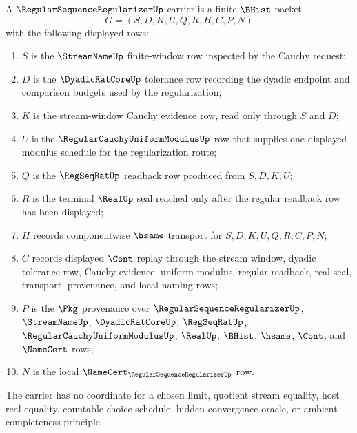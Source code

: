\begin{definition}
\label{def:regular-sequence-regularizer-carrier}
A $\RegularSequenceRegularizerUp$ carrier is a finite $\BHist$ packet
$$
G=(S,D,K,U,Q,R,H,C,P,N)
$$
with the following displayed rows:
\begin{enumerate}
\item $S$ is the $\StreamNameUp$ finite-window row inspected by the Cauchy request;
\item $D$ is the $\DyadicRatCoreUp$ tolerance row recording the dyadic endpoint and comparison budgets used by the regularization;
\item $K$ is the stream-window Cauchy evidence row, read only through $S$ and $D$;
\item $U$ is the $\RegularCauchyUniformModulusUp$ row that supplies one displayed modulus schedule for the regularization route;
\item $Q$ is the $\RegSeqRatUp$ readback row produced from $S,D,K,U$;
\item $R$ is the terminal $\RealUp$ seal reached only after the regular readback row has been displayed;
\item $H$ records componentwise $\hsame$ transport for $S,D,K,U,Q,R,C,P,N$;
\item $C$ records displayed $\Cont$ replay through the stream window, dyadic tolerance row, Cauchy evidence, uniform modulus, regular readback, real seal, transport, provenance, and local naming rows;
\item $P$ is the $\Pkg$ provenance over $\RegularSequenceRegularizerUp$, $\StreamNameUp$, $\DyadicRatCoreUp$, $\RegSeqRatUp$, $\RegularCauchyUniformModulusUp$, $\RealUp$, $\BHist$, $\hsame$, $\Cont$, and $\NameCert$ rows;
\item $N$ is the local $\NameCert_{\RegularSequenceRegularizerUp}$ row.
\end{enumerate}
The carrier has no coordinate for a chosen limit, quotient stream equality, host real equality, countable-choice schedule, hidden convergence oracle, or ambient completeness principle.
\end{definition}

